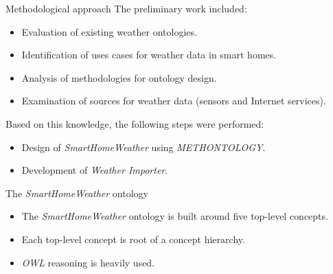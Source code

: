 \documentclass[final,hyperref={pdfpagelabels=true}]{beamer}
\begin{document}
\begin{frame}[fragile]
\begin{columns}[t]
\begin{column}{.45\textwidth}
      \begin{block}{Methodological approach}
	The preliminary work included:
	\begin{itemize}
	  \item Evaluation of existing weather ontologies.
	  \item Identification of uses cases for weather data in smart homes.
	  \item Analysis of methodologies for ontology design.
	  \item Examination of sources for weather data (sensors and Internet services).
	\end{itemize}
	
	\vspace{.5em}
	Based on this knowledge, the following steps were performed:
	
	\begin{itemize}
	  \item Design of \emph{SmartHomeWeather} using \emph{METHONTOLOGY}. %
	  \item Development of \emph{Weather Importer}.
	\end{itemize}
      \end{block}

      \begin{block}{The \emph{SmartHomeWeather} ontology}
	\begin{itemize}
	  \item The \emph{SmartHomeWeather} ontology is built around five top-level concepts.
	  \item Each top-level concept is root of a concept hierarchy.
	  \item \emph{OWL} reasoning is heavily used.
	\end{itemize}
      \end{block}
    \end{column}


\end{columns}
\end{frame}
\end{document}
